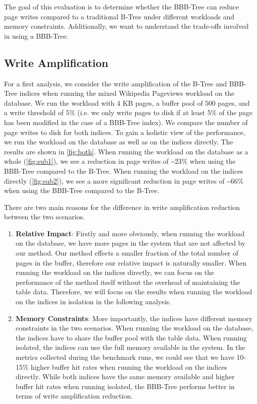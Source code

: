 The goal of this evaluation is to determine whether the BBB-Tree can reduce page writes compared to a traditional B-Tree under different workloads and memory constraints.
Additionally, we want to understand the trade-offs involved in using a BBB-Tree.

\subsection{Write Amplification}
For a first analysis, we consider the write amplification of the B-Tree and BBB-Tree indices when running the mixed Wikipedia Pageviews workload on the database.
We run the workload with 4 KB pages, a buffer pool of 500 pages, and a write threshold of 5\% (i.e. we only write pages to disk if at least 5\% of the page has been modified in the case of a BBB-Tree index).
We compare the number of page writes to disk for both indices.
To gain a holistic view of the performance, we run the workload on the database as well as on the indices directly.
The results are shown in \autoref{fig:both}.
When running the workload on the database as a whole (\autoref{fig:sub1}), we see a reduction in page writes of \textasciitilde23\% when using the BBB-Tree compared to the B-Tree.
When running the workload on the indices directly (\autoref{fig:sub2}), we see a more significant reduction in page writes of \textasciitilde66\% when using the BBB-Tree compared to the B-Tree.

There are two main reasons for the difference in write amplification reduction between the two scenarios.
\begin{enumerate}
  \item \textbf{Relative Impact}: Firstly and more obviously, when running the workload on the database, we have more pages in the system that are not affected by our method.
Our method effects a smaller fraction of the total number of pages in the buffer, therefore our relative impact is naturally smaller.
When running the workload on the indices directly, we can focus on the performance of the method itself without the overhead of maintaining the table data.
Therefore, we will focus on the results when running the workload on the indices in isolation in the following analysis.
  \item \textbf{Memory Constraints}: More importantly, the indices have different memory constraints in the two scenarios.
When running the workload on the database, the indices have to share the buffer pool with the table data.
When running isolated, the indices can use the full memory available in the system. 
In the metrics collected during the benchmark runs, we could see that we have 10-15\% higher buffer hit rates when running the workload on the indices directly.
While both indices have the same memory available and higher buffer hit rates when running isolated, the BBB-Tree performs better in terms of write amplification reduction.
\end{enumerate}

